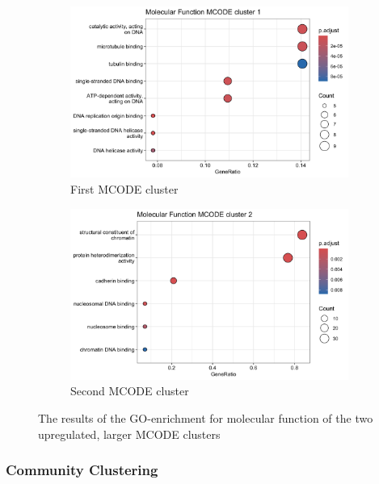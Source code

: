  \begin{figure}[htb]
 	\centering
		\begin{subfigure}{.49\textwidth}
			\centering
 			\includegraphics[width=\textwidth]{fig/mf-mcode-cluster1}
 			\caption{First MCODE cluster}
 		\end{subfigure}
    	\begin{subfigure}{.49\textwidth}
    		\centering
 			\includegraphics[width=\textwidth]{fig/mf-mcode-cluster2.png}
 			\caption{Second MCODE cluster}
 		\end{subfigure}
 	\caption{The results of the GO-enrichment for molecular function of the two upregulated, larger MCODE clusters}
 	\label{fig:mcode-cluster-mf}
 \end{figure}


\subsubsection{Community Clustering}


